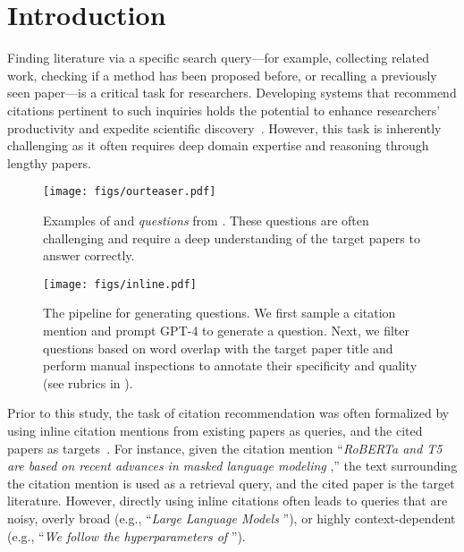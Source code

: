 \section{Introduction}
\label{sec:intro}

Finding literature via a specific search query---for example, collecting related work, checking if a method has been proposed before, or recalling a previously seen paper---is a critical task for researchers. 
Developing systems that recommend citations pertinent to such inquiries holds the potential to enhance researchers' productivity and expedite scientific discovery~\cite{farber2020citation}.
However, this task is inherently challenging as it often requires deep domain expertise and reasoning through lengthy papers. 

\begin{figure}[t]
    \centering
    \texttt{[image: figs/ourteaser.pdf]}
    \caption{Examples of \textit{\inlineq{}} and \textit{\authorq{} questions} from  \ours{}. These questions are often challenging and require a deep understanding of the target papers to answer correctly. 
    }
    \label{fig:teaser}
\end{figure}

\begin{figure*}[t]
    \centering
    \texttt{[image: figs/inline.pdf]}
    \caption{The pipeline for generating \inlineq{} questions. We first sample a citation mention and prompt GPT-4 to generate a question. Next, we filter questions based on word overlap with the target paper title and perform manual inspections to annotate their specificity and quality (see rubrics in ). 
    }
    \label{fig:inline}
\end{figure*}

Prior to this study, the task of citation recommendation was 
often formalized by 
using inline citation mentions from existing papers as queries, and the cited papers as targets~\cite{he2010context, gu2022local}.
For instance, given the citation mention ``\textit{RoBERTa and T5 are based on recent advances in masked language modeling \ttt{[citation]}},'' the text surrounding the citation mention is used as a retrieval query, and the cited paper is the target literature. 
However, directly using inline citations often leads to queries that are noisy, overly broad (e.g., ``\textit{Large Language Models \ttt{[citation]}}''), or highly context-dependent (e.g., ``\textit{We follow the hyperparameters of \ttt{[citation]}}'').


